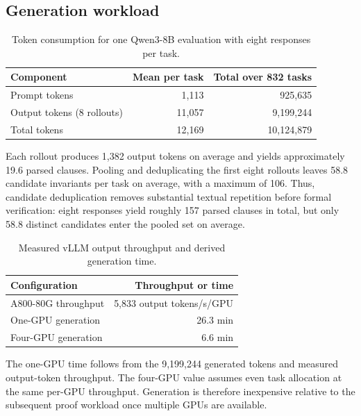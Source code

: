 \documentclass[10pt]{article}
\begin{document}
\subsection{Generation workload}

\begin{table}[H]
\centering
\begin{tabular}{lrr}
\toprule
\rowcolor{headerbg}
Component & Mean per task & Total over 832 tasks \\
\midrule
Prompt tokens              & 1,113  & 925,635 \\
Output tokens (8 rollouts) & 11,057 & 9,199,244 \\
Total tokens               & 12,169 & 10,124,879 \\
\bottomrule
\end{tabular}
\caption{Token consumption for one Qwen3-8B evaluation with eight responses per task.}
\label{tab:supp-resource-tokens}
\end{table}

Each rollout produces 1,382 output tokens on average and yields approximately
19.6 parsed clauses.  Pooling and deduplicating the first eight rollouts leaves
58.8 candidate invariants per task on average, with a maximum of 106.  Thus,
candidate deduplication removes substantial textual repetition before formal
verification: eight responses yield roughly 157 parsed clauses in total, but
only 58.8 distinct candidates enter the pooled set on average.

\begin{table}[H]
\centering
\begin{tabular}{lr}
\toprule
\rowcolor{headerbg}
Configuration & Throughput or time \\
\midrule
A800-80G throughput & 5,833 output tokens/s/GPU \\
One-GPU generation & 26.3 min \\
Four-GPU generation & 6.6 min \\
\bottomrule
\end{tabular}
\caption{Measured vLLM output throughput and derived generation time.}
\label{tab:supp-resource-generation}
\end{table}

The one-GPU time follows from the 9,199,244 generated tokens and measured
output-token throughput.  The four-GPU value assumes even task allocation at
the same per-GPU throughput.  Generation is therefore inexpensive relative to
the subsequent proof workload once multiple GPUs are available.
\end{document}
